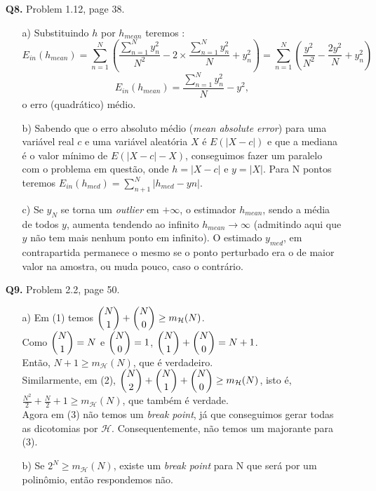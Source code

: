 \documentclass[12pt]{article}
\begin{document}
\begin{enumerate}
\item [\textbf{Q8.}] Problem 1.12, page 38.
	\begin{addmargin}[1em]{2em}
		\begin{itemize}
			\item[a)] Substituindo $h$ por $h_{mean}$ teremos : \[E_{in}(h_{mean}) = \sum_{n=1}^{N}(\frac{\sum_{n=1}^{N}y_n^2}{N^2} - 2 \times \frac{\sum_{n=1}^{N}y_n^2}{N} + y_n^2) = \sum_{n=1}^{N}(\frac{y^2}{N^2} - \frac{2y^2}{N} + y_n^2)\] \[ E_{in}(h_{mean}) = \frac{\sum_{n=1}^{N}y_n^2}{N} - y^2,\]
			o erro (quadrático) médio. 
			\item[b)] Sabendo que o erro absoluto médio (\textit{mean absolute error}) para uma variável real $c$ e uma variável aleatória $X$ é $E(|X - c|)$ e que a mediana é o valor mínimo de $E(|X-c| - X)$, conseguimos fazer um paralelo com o problema em questão, onde $h=|X-c|$ e $y = |X|$. Para N pontos teremos $E_{in}(h_{med}) = \sum_{n+1}^{N}|h_{med} - yn|$.
			\item[c)] Se $y_N$ se torna um \textit{outlier} em $+ \infty$, o estimador $h_{mean}$, sendo a média de todos $y$, aumenta tendendo ao infinito $h_{mean} \rightarrow \infty$ (admitindo aqui que $y$ não tem mais nenhum ponto em infinito). O estimado $y_{med}$, em contrapartida permanece o mesmo se o ponto perturbado era o de maior valor na amostra, ou muda pouco, caso o contrário.
		\end{itemize}
	\end{addmargin}

\item [\textbf{Q9.}] Problem 2.2, page 50.
	\begin{addmargin}[1em]{2em}
		\begin{itemize}
			\item[a)] Em (1) temos $\dbinom{N}{1} + \dbinom{N}{0} \geq m_{\mathcal{H}}(N)$.\\
			Como $\dbinom{N}{1} = N$ e $\dbinom{N}{0} = 1$, $\dbinom{N}{1} + \dbinom{N}{0} = N+1$.\\
			Então, $N + 1 \geq m_{\mathcal{H}}(N)$, que é verdadeiro.\\
			Similarmente, em (2), $\dbinom{N}{2} + \dbinom{N}{1} + \dbinom{N}{0} \geq m_{\mathcal{H}}(N)$, isto é,\\ 
			$\frac{N^2}{2} + \frac{N}{2} + 1 \geq m_{\mathcal{H}}(N)$, que também é verdade.\\
			Agora  em (3) não temos um \textit{break point}, já que conseguimos gerar todas as dicotomias por $\mathcal{H}$. Consequentemente,  não temos um majorante para (3).
			\item[b)] Se $2^N \geq m_{\mathcal{H}}(N)$, existe um \textit{break point} para N que será por um polinômio, então respondemos não.
		\end{itemize}
	\end{addmargin}
	

\end{enumerate}
\end{document}
